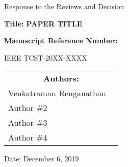 \begin{titlepage}
\centering
{\LARGE Response to the Reviews and Decision \par}
\vspace{1.5cm}

{\large \bfseries Title: PAPER TITLE	 \par}
\vspace{1.5cm}
    
    {\large \bfseries Manuscript Reference Number: \par
    IEEE TCST-20XX-XXXX}
\vspace{1.5cm}
  
\begin{table}[h!]
\renewcommand{\arraystretch}{1}
\centering
\begin{tabular}{lc}
\multicolumn{2}{c}{\large \bfseries Authors:} \\
\large Venkatraman Renganathan \\
\large Author \#2 \\
\large Author \#3 \\
\large Author \#4 \\
\end{tabular}
\end{table}
\vspace{1.5cm}
\large Date: December 6, 2019    

\end{titlepage}
